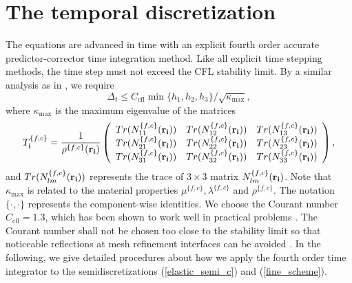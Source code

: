 \section{The temporal discretization}
The equations are advanced in time with an explicit fourth order accurate predictor-corrector time integration method. Like all explicit time stepping methods, the time step must not exceed the CFL stability limit. By a similar analysis as in \cite{sjogreen2012fourth}, we require 
\begin{equation*}
\Delta_t\leq C_{\text{cfl}}\min\{h_1,h_2,h_3\}/\sqrt{\kappa_{\max}},
\end{equation*}
where %
$\kappa_{\text{max}}$ is the maximum eigenvalue of the matrices 
\[T_{\bf i}^{\{f,c\}} = \frac{1}{\rho^{\{f,c\}}({\bf r}_{\bf i})}\left(\begin{array}{ccc}
Tr(N_{11}^{\{f,c\}}({\bf r}_{\bf i})) &  Tr(N_{12}^{\{f,c\}}({\bf r}_{\bf i}))& Tr(N_{13}^{\{f,c\}}({\bf r}_{\bf i}))\\
Tr(N_{21}^{\{f,c\}}({\bf r}_{\bf i})) & Tr(N_{22}^{\{f,c\}}({\bf r}_{\bf i})) & Tr(N_{23}^{\{f,c\}}({\bf r}_{\bf i}))\\
Tr(N_{31}^{\{f,c\}}({\bf r}_{\bf i})) & Tr(N_{32}^{\{f,c\}}({\bf r}_{\bf i})) & Tr(N_{33}^{\{f,c\}}({\bf r}_{\bf i}))\end{array}\right), \]
and $Tr(N_{lm}^{\{f,c\}}({\bf r}_{\bf i}))$ represents the trace of $3\times3$ matrix $N_{lm}^{\{f,c\}}({\bf r}_{\bf i})$. Note that $\kappa_{\text{max}}$ is related to the material properties $\mu^{\{f,c\}}, \lambda^{\{f,c\}}$ and $\rho^{\{f,c\}}$. The notation $\{\cdot,\cdot\}$ represents the component-wise identities. We choose the Courant number $C_{\text{cfl}} = 1.3$, which has been shown to work well in practical problems \cite{petersson2015wave,sjogreen2012fourth}. The Courant number shall not be chosen too close to the stability limit so that noticeable reflections at mesh refinement interfaces can be avoided \cite{Collino2003}. In the following, we give detailed procedures about how we apply the fourth order time integrator to the semidiscretizations (\ref{elastic_semi_c}) and  (\ref{fine_scheme}). 

